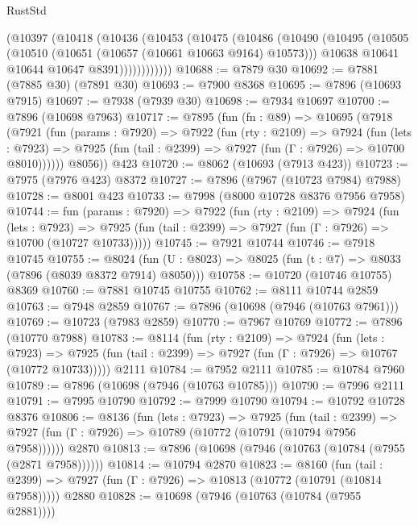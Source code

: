 \begin{lexlean}{RustStd}
\begin{coremodule}
          (@10397
            (@10418
              (@10436
                (@10453
                  (@10475
                    (@10486
                      (@10490
                        (@10495
                          (@10505
                            (@10510 (@10651 (@10657 (@10661 @10663 @9164) @10573)))
                            @10638
                            @10641
                            @10644
                            @10647
                            @8391))))))))))))
@10688 := @7879 @30
@10692 := @7881 (@7885 @30) (@7891 @30)
@10693 := @7900 @8368
@10695 := @7896 (@10693 @7915)
@10697 := @7938 (@7939 @30)
@10698 := @7934 @10697
@10700 := @7896 (@10698 @7963)
@10717 := @7895
    (fun (fn : @89) =>
    @10695
      (@7918
        (@7921
          (fun (params : @7920) =>
          @7922
            (fun (rty : @2109) =>
            @7924
              (fun (lets : @7923) =>
              @7925 (fun (tail : @2399) => @7927 (fun (Γ : @7926) => @10700 @8010))))))
        @8056))
    @423
@10720 := @8062 (@10693 (@7913 @423))
@10723 := @7975 (@7976 @423) @8372
@10727 := @7896 (@7967 (@10723 @7984) @7988)
@10728 := @8001 @423
@10733 := @7998 (@8000 @10728 @8376 @7956 @7958)
@10744 := fun (params : @7920) =>
  @7922
    (fun (rty : @2109) =>
    @7924
      (fun (lets : @7923) =>
      @7925 (fun (tail : @2399) => @7927 (fun (Γ : @7926) => @10700 (@10727 @10733)))))
@10745 := @7921 @10744
@10746 := @7918 @10745
@10755 := @8024 (fun (U : @8023) => @8025 (fun (t : @7) => @8033 (@7896 (@8039 @8372 @7914) @8050)))
@10758 := @10720 (@10746 @10755) @8369
@10760 := @7881 @10745 @10755
@10762 := @8111 @10744 @2859
@10763 := @7948 @2859
@10767 := @7896 (@10698 (@7946 (@10763 @7961)))
@10769 := @10723 (@7983 @2859)
@10770 := @7967 @10769
@10772 := @7896 (@10770 @7988)
@10783 := @8114
    (fun (rty : @2109) =>
    @7924
      (fun (lets : @7923) =>
      @7925 (fun (tail : @2399) => @7927 (fun (Γ : @7926) => @10767 (@10772 @10733)))))
    @2111
@10784 := @7952 @2111
@10785 := @10784 @7960
@10789 := @7896 (@10698 (@7946 (@10763 @10785)))
@10790 := @7996 @2111
@10791 := @7995 @10790
@10792 := @7999 @10790
@10794 := @10792 @10728 @8376
@10806 := @8136
    (fun (lets : @7923) =>
    @7925
      (fun (tail : @2399) =>
      @7927 (fun (Γ : @7926) => @10789 (@10772 (@10791 (@10794 @7956 @7958))))))
    @2870
@10813 := @7896 (@10698 (@7946 (@10763 (@10784 (@7955 (@2871 @7958))))))
@10814 := @10794 @2870
@10823 := @8160
    (fun (tail : @2399) => @7927 (fun (Γ : @7926) => @10813 (@10772 (@10791 (@10814 @7958)))))
    @2880
@10828 := @10698 (@7946 (@10763 (@10784 (@7955 @2881))))

\end{coremodule}
\end{lexlean}
